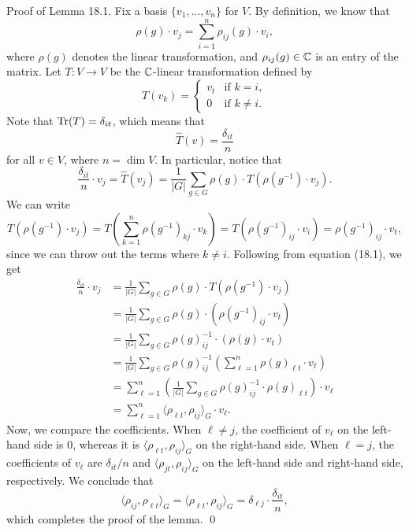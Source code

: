 {\sc Proof of Lemma 18.1.} Fix a basis $\{v_1, \dots, v_n\}$ for $V$. 
By definition, we know that 
\[ \rho(g) \cdot v_j = \sum_{i=1}^n \rho_{ij}(g) \cdot v_i, \] 
where $\rho(g)$ denotes the linear transformation, and $\rho_{ij}(g) \in \mathbb{C}$ 
is an entry of the matrix. Let $T : V \to V$ be the $\mathbb{C}$-linear transformation 
defined by 
\[ T(v_k) = \begin{cases} 
    v_t & \text{if } k = i, \\ 
    0 & \text{if } k \neq i. 
\end{cases} \] 
Note that $\operatorname{Tr}(T) = \delta_{it}$, which means that 
\[ \hat T(v) = \frac{\delta_{it}}{n} \] 
for all $v \in V$, where $n = \dim V$. In particular, notice that 
\begin{equation}
    \frac{\delta_{it}}{n} \cdot v_j = \hat T(v_j) = \frac1{|G|} \sum_{g \in G} 
    \rho(g) \cdot T(\rho(g^{-1}) \cdot v_j). 
\end{equation}
We can write 
\[ T(\rho(g^{-1}) \cdot v_j) = T \left( \sum_{k=1}^n \rho(g^{-1})_{kj} \cdot v_k 
\right) = T(\rho(g^{-1})_{ij} \cdot v_i) = \rho(g^{-1})_{ij} \cdot v_t, \] 
since we can throw out the terms where $k \neq i$. Following from 
equation (18.1), we get 
\begin{align*}
    \frac{\delta_{it}}{n} \cdot v_j 
    &= \frac1{|G|} \sum_{g \in G} \rho(g) \cdot T(\rho(g^{-1}) \cdot v_j) \\ 
    &= \frac1{|G|} \sum_{g \in G} \rho(g) \cdot (\rho(g^{-1})_{ij} \cdot v_t) \\ 
    &= \frac1{|G|} \sum_{g \in G} \rho(g)_{ij}^{-1} \cdot (\rho(g) \cdot v_t) \\ 
    &= \frac1{|G|} \sum_{g \in G} \rho(g)_{ij}^{-1} \left( \sum_{\ell=1}^n 
       \rho(g)_{\ell t} \cdot v_\ell \right) \\ 
    &= \sum_{\ell=1}^n \left( \frac1{|G|} \sum_{g \in G} \rho(g)_{ij}^{-1} 
       \cdot \rho(g)_{\ell t} \right) \cdot v_\ell \\ 
    &= \sum_{\ell=1}^n \langle \rho_{\ell t}, \rho_{ij} \rangle_G \cdot v_\ell. 
\end{align*}
Now, we compare the coefficients. When $\ell \neq j$, the coefficient of 
$v_\ell$ on the left-hand side is $0$, whereas it is $\langle \rho_{\ell t}, 
\rho_{ij} \rangle_G$ on the right-hand side. When $\ell = j$, the coefficients
of $v_\ell$ are $\delta_{it}/n$ and $\langle \rho_{jt}, \rho_{ij} \rangle_G$ 
on the left-hand side and right-hand side, respectively. We conclude that 
\[ \langle \rho_{ij}, \rho_{\ell t} \rangle_G = \langle \rho_{\ell t}, 
\rho_{ij} \rangle_G = \delta_{\ell j} \cdot \frac{\delta_{it}}{n}, \] 
which completes the proof of the lemma. \qed 

